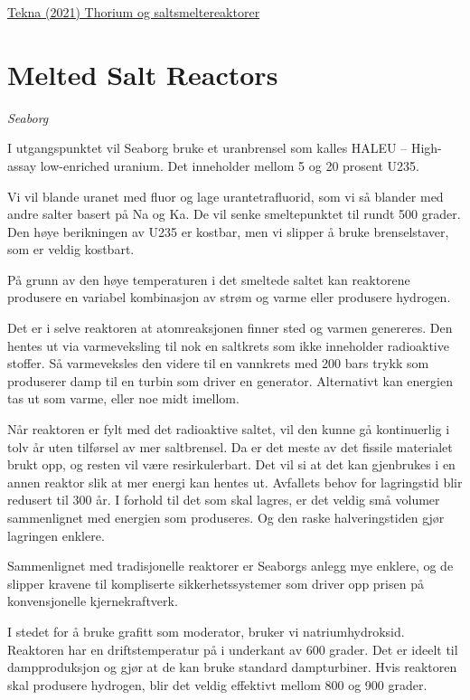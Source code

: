 \documentclass[
]{book}
\begin{document}
\href{https://www.tekna.no/fag-og-nettverk/energi/energibloggen/thorium-og-saltsmeltereaktorer/}{Tekna (2021) Thorium og saltsmeltereaktorer}

\hypertarget{melted-salt-reactors}{%
\section{Melted Salt Reactors}\label{melted-salt-reactors}}

\emph{Seaborg}

I utgangspunktet vil Seaborg bruke et uranbrensel som kalles HALEU -- High-assay low-enriched uranium. Det inneholder mellom 5 og 20 prosent U235.

Vi vil blande uranet med fluor og lage urantetrafluorid, som vi så blander med andre salter basert på Na og Ka. De vil senke smeltepunktet til rundt 500 grader. Den høye berikningen av U235 er kostbar, men vi slipper å bruke brenselstaver, som er veldig kostbart.

På grunn av den høye temperaturen i det smeltede saltet kan reaktorene produsere en variabel kombinasjon av strøm og varme eller produsere hydrogen.

Det er i selve reaktoren at atomreaksjonen finner sted og varmen genereres. Den hentes ut via varmeveksling til nok en saltkrets som ikke inneholder radioaktive stoffer. Så varmeveksles den videre til en vannkrets med 200 bars trykk som produserer damp til en turbin som driver en generator. Alternativt kan energien tas ut som varme, eller noe midt imellom.

Når reaktoren er fylt med det radioaktive saltet, vil den kunne gå kontinuerlig i tolv år uten tilførsel av mer saltbrensel. Da er det meste av det fissile materialet brukt opp, og resten vil være resirkulerbart. Det vil si at det kan gjenbrukes i en annen reaktor slik at mer energi kan hentes ut. Avfallets behov for lagringstid blir redusert til 300 år. I forhold til det som skal lagres, er det veldig små volumer sammenlignet med energien som produseres. Og den raske halveringstiden gjør lagringen enklere.

Sammenlignet med tradisjonelle reaktorer er Seaborgs anlegg mye enklere, og de slipper kravene til kompliserte sikkerhetssystemer som driver opp prisen på konvensjonelle kjernekraftverk.

I stedet for å bruke grafitt som moderator, bruker vi natriumhydroksid.
Reaktoren har en driftstemperatur på i underkant av 600 grader. Det er ideelt til dampproduksjon og gjør at de kan bruke standard dampturbiner. Hvis reaktoren skal produsere hydrogen, blir det veldig effektivt mellom 800 og 900 grader.
\end{document}
